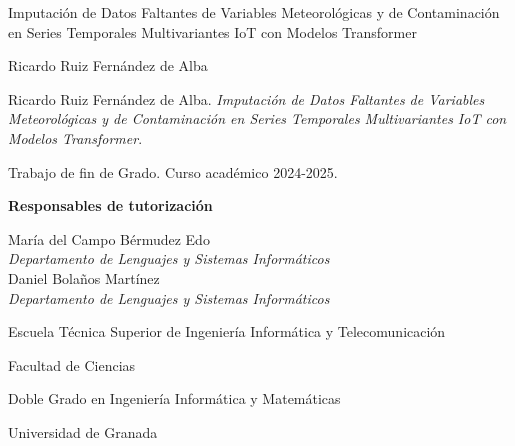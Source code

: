 \thispagestyle{empty}

\begin{center}
  \large


  \begingroup
  \huge{Imputación de Datos Faltantes de Variables Meteorológicas y de Contaminación en Series  Temporales Multivariantes IoT con Modelos Transformer} \\ \bigskip
  \endgroup

  \textrm{Ricardo Ruiz Fernández de Alba}


\end{center}

\newpage
\thispagestyle{empty}

\hfill

\vfill

\noindent Ricardo Ruiz Fernández de Alba. \textit{Imputación de Datos Faltantes de Variables Meteorológicas y de Contaminación en Series  Temporales Multivariantes IoT con Modelos Transformer}.

Trabajo de fin de Grado. Curso académico 2024-2025.

\begin{minipage}[t]{0.25\textwidth}
  \flushleft
  \textbf{Responsables de tutorización}
\end{minipage}
\begin{minipage}[t]{0.45\textwidth}
  \flushleft
  María del Campo Bérmudez Edo \\ \emph{Departamento de Lenguajes y Sistemas Informáticos} 
  \medskip \\
  Daniel Bolaños Martínez \\ \emph{Departamento de Lenguajes y Sistemas Informáticos} 
\end{minipage}
\begin{minipage}[t]{0.30\textwidth}
  \flushright

  Escuela Técnica Superior de Ingeniería Informática y Telecomunicación
  \medskip

  Facultad de Ciencias
  \medskip \medskip
  
  Doble Grado en Ingeniería Informática y Matemáticas
  \medskip
  
  Universidad de Granada
\end{minipage}
\begin{flushleft}
\end{flushleft}

\endinput